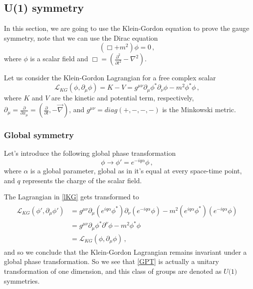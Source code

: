 \subsection{U(1) symmetry}

In this section, we are going to use the Klein-Gordon equation to prove the gauge symmetry, note that we can use the Dirac equation
\begin{equation}
	\label{KG}
	(\Box + m^2)\phi = 0\,,
\end{equation}
where $\phi$ is a scalar field \cite{grif} and $\Box=\left(\frac{\partial^2}{\partial t^2}-\nabla^2\right)$.

Let us consider the Klein-Gordon Lagrangian for a free complex scalar
\begin{equation}
	\label{lKG}
	\mathcal{L}_{KG}(\phi,\partial_\mu\phi)=K-V=g^{\mu\nu}\partial_\mu\phi^*\partial_\nu \phi - m^2 \phi^*\phi\,,
\end{equation}
where $K$ and $V$ are the kinetic and potential term, respectively, $\partial_\mu=\frac{\partial}{\partial x_\mu}=(\frac{\partial}{\partial t},-\vec{\nabla})$, and $g^{\mu\nu}=diag(+,-,-,-)$ is the Minkowski metric.
\subsubsection{Global symmetry}
Let's introduce the following global phase transformation
\begin{equation}
	\label{GPT}
	\phi\rightarrow \phi'=e^{-iq\alpha}\phi\,,
\end{equation}
where $\alpha$ is a global parameter, global as in it's equal at every space-time point, and $q$ 
represents the charge of the scalar field.

The Lagrangian in \autoref{lKG} gets transformed to
\begin{align}
	\label{tlKG}
	\begin{array}{lll}
			\mathcal{L}_{KG}(\phi',\partial_\mu\phi')&=g^{\mu\nu}\partial_\mu(e^{iq\alpha}\phi^*)\partial_\nu(e^{-iq\alpha}\phi) - m^2 (e^{iq\alpha}\phi^*)(e^{-iq\alpha}\phi) \\
			&=g^{\mu\nu}\partial_\mu\phi^*\partial^\nu \phi - m^2 \phi^*\phi \\
			&=\mathcal{L}_{KG}(\phi,\partial_\mu\phi)\,,
	\end{array}
\end{align}
and so we conclude that the Klein-Gordon Lagrangian remains invariant under a global phase transformation.
So we see that \autoref{GPT} is actually a unitary transformation of one dimension, and this class of groups are denoted as $U\textrm{(1)}$ symmetries. 

